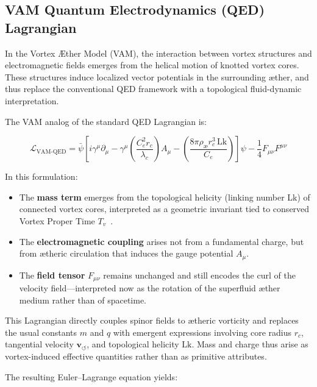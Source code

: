 \documentclass[preprint]{revtex4-2}
\begin{document}
\subsection*{VAM Quantum Electrodynamics (QED) Lagrangian}

In the Vortex Æther Model (VAM), the interaction between vortex structures and electromagnetic fields emerges from the helical motion of knotted vortex cores. These structures induce localized vector potentials in the surrounding æther, and thus replace the conventional QED framework with a topological fluid-dynamic interpretation.

The VAM analog of the standard QED Lagrangian is:

\begin{equation}
    \mathcal{L}_\text{VAM-QED} =
    \bar{\psi} \left[ i \gamma^\mu \partial_\mu
                   - \gamma^\mu \left( \frac{C_e^2 r_c}{\lambda_c} \right) A_\mu
                   - \left( \frac{8\pi \rho_\text{\ae} r_c^3 \, \text{Lk}}{C_e} \right) \right] \psi
    - \frac{1}{4} F_{\mu\nu} F^{\mu\nu}
\end{equation}

In this formulation:
\begin{itemize}
    \item The \textbf{mass term} emerges from the topological helicity (linking number Lk) of connected vortex cores, interpreted as a geometric invariant tied to conserved Vortex Proper Time \( T_v \)~\cite{volovik2003}.
    \item The \textbf{electromagnetic coupling} arises not from a fundamental charge, but from ætheric circulation that induces the gauge potential \( A_\mu \).
    \item The \textbf{field tensor} \( F_{\mu\nu} \) remains unchanged and still encodes the curl of the velocity field—interpreted now as the rotation of the superfluid æther medium rather than of spacetime.
\end{itemize}

This Lagrangian directly couples spinor fields to ætheric vorticity and replaces the usual constants \( m \) and \( q \) with emergent expressions involving core radius \( r_c \), tangential velocity \( \mathbf{v}_{\scriptscriptstyle\boldsymbol{\circlearrowleft}} \), and topological helicity \( \text{Lk} \). Mass and charge thus arise as vortex-induced effective quantities rather than as primitive attributes.

The resulting Euler–Lagrange equation yields:
\end{document}
